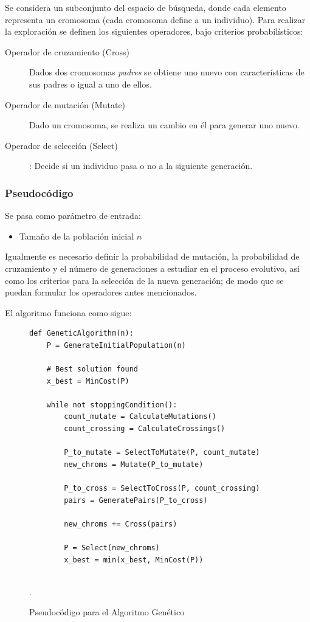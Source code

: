 \documentclass[titlepage, 11pt]{scrartcl}
\begin{document}
	    	Se considera un subconjunto del espacio de búsqueda, donde cada elemento representa un cromosoma (cada cromosoma define a un individuo). Para realizar la exploración se definen los siguientes operadores, bajo criterios probabilísticos:
	    	\begin{description}
	    		\item[Operador de cruzamiento (Cross)] Dados dos cromosomas \textit{padres} se obtiene uno nuevo con características de sus padres o igual a uno de ellos.
	    		\item[Operador de mutación (Mutate)] Dado un cromosoma, se realiza un cambio en él para generar uno nuevo.
	    		\item[Operador de selección (Select)]: Decide si un individuo pasa o no a la siguiente generación.
	    	\end{description}
	    	
	    	\subsubsection{Pseudocódigo}
	    		Se pasa como parámetro de entrada:
	    		\begin{itemize}
	    			\item Tamaño de la población inicial $n$
	    		\end{itemize}
    		
    			Igualmente es necesario definir la probabilidad de mutación, la probabilidad de cruzamiento y el número de generaciones a estudiar en el proceso evolutivo, así como los criterios para la selección de la nueva generación; de modo que se puedan formular los operadores antes mencionados.
	    		
    			El algoritmo funciona como sigue:
	    		\begin{figure}[H]
	    			\begin{verbatim}
def GeneticAlgorithm(n):
	P = GenerateInitialPopulation(n)

	# Best solution found 
	x_best = MinCost(P)
	
	while not stoppingCondition():
		count_mutate = CalculateMutations()
		count_crossing = CalculateCrossings()
		
		P_to_mutate = SelectToMutate(P, count_mutate)
		new_chroms = Mutate(P_to_mutate)
		
		P_to_cross = SelectToCross(P, count_crossing)
		pairs = GeneratePairs(P_to_cross)
		
		new_chroms += Cross(pairs)
		
		P = Select(new_chroms)
		x_best = min(x_best, MinCost(P))
		    	
	    			\end{verbatim}
	    			\caption{Pseudocódigo para el Algoritmo Genético}.
    			\end{figure}
	    	
\end{document}
